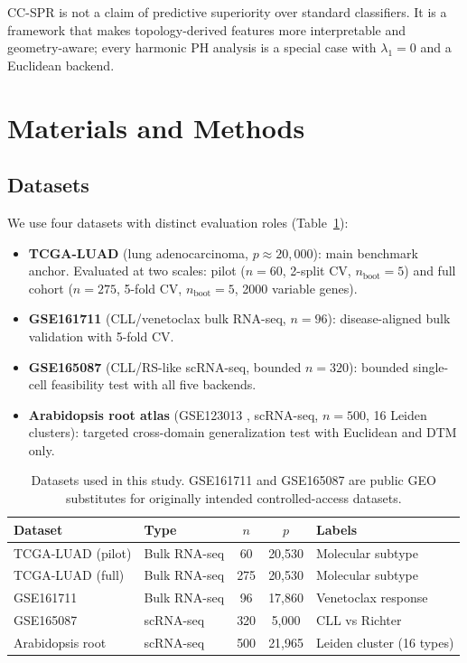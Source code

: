 \documentclass[12pt]{article}
\begin{document}
CC-SPR is not a claim of predictive superiority over standard classifiers.
It is a framework that makes topology-derived features more interpretable and geometry-aware; every harmonic PH analysis is a special case with $\lambda_1 = 0$ and a Euclidean backend.


\section{Materials and Methods}
\label{sec:methods}

\subsection{Datasets}
\label{sec:datasets}

We use four datasets with distinct evaluation roles (Table~\ref{tab:datasets}):
\begin{itemize}[leftmargin=1.5em]
\item \textbf{TCGA-LUAD} (lung adenocarcinoma, $p \approx 20{,}000$): main benchmark anchor.
Evaluated at two scales: pilot ($n = 60$, 2-split CV, $n_{\text{boot}} = 5$) and full cohort ($n = 275$, 5-fold CV, $n_{\text{boot}} = 5$, 2000 variable genes).
\item \textbf{GSE161711} (CLL/venetoclax bulk RNA-seq, $n = 96$): disease-aligned bulk validation with 5-fold CV.
\item \textbf{GSE165087} (CLL/RS-like scRNA-seq, bounded $n = 320$): bounded single-cell feasibility test with all five backends.
\item \textbf{Arabidopsis root atlas} (GSE123013 \cite{denyer2019}, scRNA-seq, $n = 500$, 16 Leiden clusters): targeted cross-domain generalization test with Euclidean and DTM only.
\end{itemize}

\begin{table}[h]
\centering\small
\begin{tabular}{llccl}
\toprule
Dataset & Type & $n$ & $p$ & Labels \\
\midrule
TCGA-LUAD (pilot) & Bulk RNA-seq & 60 & 20,530 & Molecular subtype \\
TCGA-LUAD (full) & Bulk RNA-seq & 275 & 20,530 & Molecular subtype \\
GSE161711 & Bulk RNA-seq & 96 & 17,860 & Venetoclax response \\
GSE165087 & scRNA-seq & 320 & 5,000 & CLL vs Richter \\
Arabidopsis root & scRNA-seq & 500 & 21,965 & Leiden cluster (16 types) \\
\bottomrule
\end{tabular}
\caption{Datasets used in this study. GSE161711 and GSE165087 are public GEO substitutes for originally intended controlled-access datasets.}
\label{tab:datasets}
\end{table}
\end{document}
